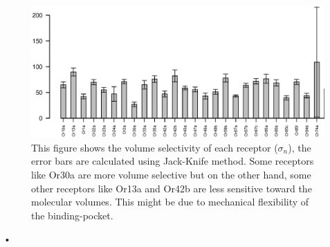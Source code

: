 \documentclass[11pt]{paper} %
\begin{document}
\begin{figure}
	\includegraphics[width=\textwidth]{fig/std-vol}
	\caption{This figure shows the volume selectivity of each receptor ($\sigma_n$), the error bars are calculated using Jack-Knife method.
	Some receptors like Or30a are more volume selective but on the other hand, some other receptors like Or13a and Or42b are less sensitive toward the molecular volumes.
	This might be due to mechanical flexibility of the binding-pocket.}
	\label{fig:volume_selectivity}
\end{figure}•



\end{document}
